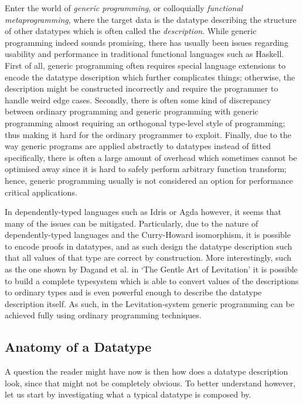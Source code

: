 \documentclass{ituthesis}
\begin{document}
Enter the world of \textit{generic programming}, or colloquially \textit{functional metaprogramming}, where the target data is the datatype describing the structure of other datatypes which is often called the \textit{description}.
While generic programming indeed sounds promising, there has usually been issues regarding usability and performance in traditional functional languages such as Haskell. 
First of all, generic programming often requires special language extensions to encode the datatype description which further complicates things; otherwise, the description might be constructed incorrectly and require the programmer to handle weird edge cases.
Secondly, there is often some kind of discrepancy between ordinary programming and generic programming with generic programming almost requiring an orthogonal type-level style of programming; thus making it hard for the ordinary programmer to exploit.
Finally, due to the way generic programs are applied abstractly to datatypes instead of fitted specifically, there is often a large amount of overhead which sometimes cannot be optimised away since it is hard to safely perform arbitrary function transform; hence, generic programming usually is not considered an option for performance critical applications.

In dependently-typed languages such as Idris or Agda however, it seems that many of the issues can be mitigated.
Particularly, due to the nature of dependently-typed languages and the Curry-Howard isomorphism, it is possible to encode proofs in datatypes, and as such design the datatype description such that all values of that type are correct by construction.
More interestingly, such as the one shown by Dagand et al. in `The Gentle Art of Levitation' it is possible to build a complete typesystem which is able to convert values of the descriptions to ordinary types and is even powerful enough to describe the datatype description itself.
As such, in the Levitation-system generic programming can be achieved fully using ordinary programming techniques.

\subsection{Anatomy of a Datatype}
\label{sub:AnatomyofaDatatype}
A question the reader might have now is then how does a datatype description look, since that might not be completely obvious. To better understand however, let us start by investigating what a typical datatype is composed by.
\end{document}
